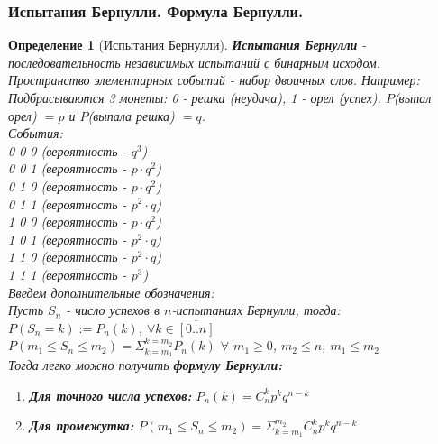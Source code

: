 \documentclass[14pt]{extarticle}
\theoremstyle{breakstyle}
\newtheorem{definition}{Определение}[subsection]
\begin{document}
\subsubsection{Испытания Бернулли. Формула Бернулли.}
\begin{definition}[Испытания Бернулли]

\textbf{Испытания Бернулли} - последовательность независимых испытаний с бинарным исходом. \\

Пространство элементарных событий - набор двоичных слов. Например: \\
Подбрасываются 3 монеты: 0 - решка (неудача), 1 - орел (успех). $P$(выпал орел) $= p$ и $P$(выпала решка) $= q$.\\

События: \\
0 0 0 (вероятность - $q^{3}$)\\
0 0 1 (вероятность - $p \cdot q^{2}$)\\
0 1 0 (вероятность - $p \cdot q^{2}$)\\
0 1 1 (вероятность - $p^{2} \cdot q$)\\
1 0 0 (вероятность - $p \cdot q^{2}$)\\
1 0 1 (вероятность - $p^{2} \cdot q$)\\
1 1 0 (вероятность - $p^{2} \cdot q$)\\
1 1 1 (вероятность - $p^{3}$)\\

Введем дополнительные обозначения: \\
Пусть $S_{n}$ - число успехов в $n$-испытаниях Бернулли, тогда: \\
$P(S_{n} = k) := P_{n}(k)$, $\forall k \in \overline{[0..n]}$ \\
$P(m_{1} \leq S_{n} \leq m_{2}) = \Sigma_{k=m_{1}}^{k=m_{2}}P_{n}(k)$ $\forall$ $m_{1} \geq 0$, $m_{2} \leq n$, $m_{1} \leq m_{2}$ \\

Тогда легко можно получить \textbf{формулу Бернулли:} 
\begin{enumerate}[noitemsep, topsep=0pt]
    \item \textbf{Для точного числа успехов:} $P_{n}(k) = C_{n}^{k}p^{k}q^{n-k}$
    \item \textbf{Для промежутка:} $P(m_{1} \leq S_{n} \leq m_{2}) = \Sigma_{k=m_{1}}^{m_{2}}C_{n}^{k}p^{k}q^{n-k}$
\end{enumerate}

\end{definition}
\end{document}
